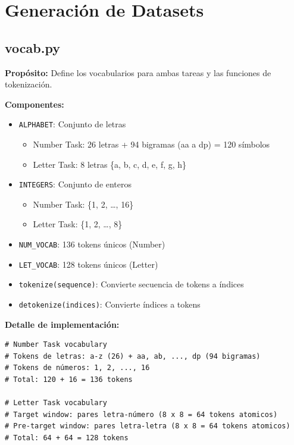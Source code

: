 \documentclass[12pt,a4paper]{report}
\begin{document}
\section{Generación de Datasets}
\label{sec:datasets}

\subsection{vocab.py}
\label{subsec:vocab}

\textbf{Propósito:} Define los vocabularios para ambas tareas y las funciones de tokenización.

\textbf{Componentes:}
\begin{itemize}
  \item \texttt{ALPHABET}: Conjunto de letras
  \begin{itemize}
    \item Number Task: 26 letras + 94 bigramas (aa a dp) = 120 símbolos
    \item Letter Task: 8 letras \{a, b, c, d, e, f, g, h\}
  \end{itemize}
  \item \texttt{INTEGERS}: Conjunto de enteros
  \begin{itemize}
    \item Number Task: \{1, 2, \ldots{}, 16\}
    \item Letter Task: \{1, 2, \ldots{}, 8\}
  \end{itemize}
  \item \texttt{NUM\_VOCAB}: 136 tokens únicos (Number)
  \item \texttt{LET\_VOCAB}: 128 tokens únicos (Letter)
  \item \texttt{tokenize(sequence)}: Convierte secuencia de tokens a índices
  \item \texttt{detokenize(indices)}: Convierte índices a tokens
\end{itemize}

\textbf{Detalle de implementación:}
\begin{lstlisting}
# Number Task vocabulary
# Tokens de letras: a-z (26) + aa, ab, ..., dp (94 bigramas)
# Tokens de números: 1, 2, ..., 16
# Total: 120 + 16 = 136 tokens

# Letter Task vocabulary
# Target window: pares letra-número (8 x 8 = 64 tokens atomicos)
# Pre-target window: pares letra-letra (8 x 8 = 64 tokens atomicos)
# Total: 64 + 64 = 128 tokens
\end{lstlisting}
\end{document}
